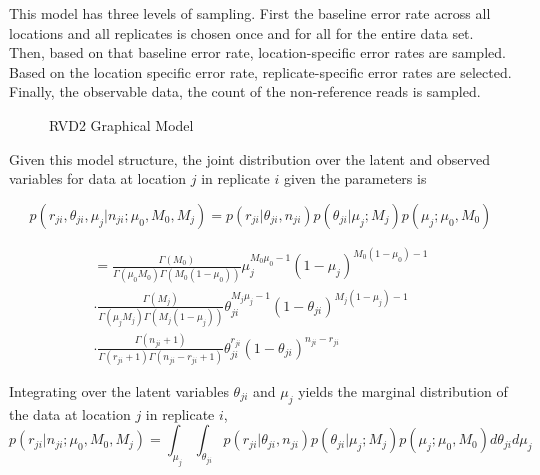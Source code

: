 \documentclass[11pt,reqno]{amsart}
\begin{document}
This model has three levels of sampling. First the baseline error rate across all locations and all replicates is chosen once and for all for the entire data set. Then, based on that baseline error rate, location-specific error rates are sampled. Based on the location specific error rate, replicate-specific error rates are selected. Finally, the observable data, the count of the non-reference reads is sampled.

\begin{figure}[h]
\begin{center}
\caption{RVD2 Graphical Model}
\label{fig:graphical_model}
\end{center}
\end{figure}


Given this model structure, the joint distribution over the latent and observed variables for data at location $j$ in replicate $i$ given the parameters is

\begin{equation}\label{eqn:jointpdf}
p \left( r_{ji}, \theta_{ji}, \mu_j | n_{ji}; \mu_0, M_0, M_j \right) = p \left( r_{ji} | \theta_{ji}, n_{ji} \right) p\left( \theta_{ji} | \mu_j; M_j \right) p\left( \mu_j; \mu_0, M_0 \right)
\end{equation}

\begin{gather}
= \frac{ \Gamma(M_0) } { \Gamma(\mu_0 M_0) \Gamma(M_0 (1-\mu_0)) } \mu_j^{M_0\mu_0 -1} (1 - \mu_j)^{M_0 ( 1 - \mu_0) - 1} \\
\cdot \frac{ \Gamma(M_j) } { \Gamma(\mu_j M_j) \Gamma(M_j (1-\mu_j)) } \theta_{ji}^{M_j\mu_j -1} (1 - \theta_{ji})^{M_j ( 1 - \mu_j) - 1} \\
\cdot \frac{ \Gamma(n_{ji}+1) } { \Gamma(r_{ji}+1) \Gamma( n_{ji} - r_{ji} + 1 ) } \theta_{ji}^{r_{ji}} (1 - \theta_{ji})^{n_{ji} - r_{ji}}
\end{gather}

Integrating over the latent variables $\theta_{ji}$ and $\mu_j$ yields the marginal distribution of the data at location $j$ in replicate $i$, 
\begin{equation}
p \left( r_{ji} | n_{ji} ; \mu_0, M_0, M_j \right) = \int_{\mu_j} \int_{\theta_{ji}}  p \left( r_{ji} | \theta_{ji}, n_{ji} \right) p\left( \theta_{ji} | \mu_j; M_j \right) p\left( \mu_j; \mu_0, M_0 \right) d\theta_{ji} d\mu_j
\end{equation}
\end{document}
